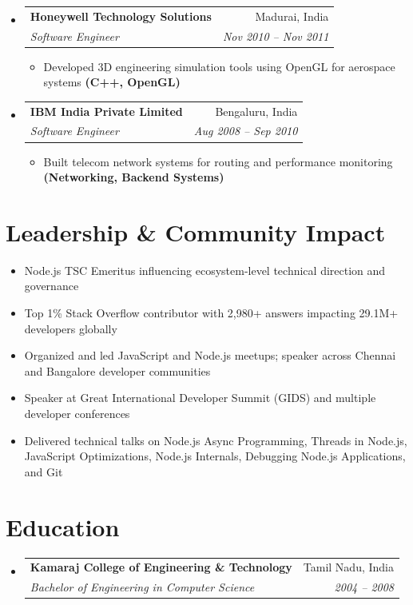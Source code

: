 \documentclass[letterpaper,11pt]{article}
\makeatletter
\newcommand{\resumeItem}[1]{\item \small{#1}}
\newcommand{\resumeSubheading}[4]{
  \vspace{-2pt}\item
  \begin{tabular*}{0.97\textwidth}{l@{\extracolsep{\fill}}r}
    \textbf{#1} & #2 \\
    \textit{\small#3} & \textit{\small #4} \\
  \end{tabular*}\vspace{-6pt}
}
\makeatother
\begin{document}
\begin{itemize}[leftmargin=*]
\resumeSubheading
{Honeywell Technology Solutions}{Madurai, India}
{Software Engineer}{Nov 2010 -- Nov 2011}

\begin{itemize}[leftmargin=*]
  \resumeItem{Developed 3D engineering simulation tools using OpenGL for aerospace systems \textbf{(C++, OpenGL)}}
\end{itemize}

\resumeSubheading
{IBM India Private Limited}{Bengaluru, India}
{Software Engineer}{Aug 2008 -- Sep 2010}

\begin{itemize}[leftmargin=*]
  \resumeItem{Built telecom network systems for routing and performance monitoring \textbf{(Networking, Backend Systems)}}
\end{itemize}

\end{itemize}

\section{Leadership \& Community Impact}
\begin{itemize}[leftmargin=*]

  \resumeItem{Node.js TSC Emeritus influencing ecosystem-level technical direction and governance}

  \resumeItem{Top 1\% Stack Overflow contributor with 2,980+ answers impacting 29.1M+ developers globally}

  \resumeItem{Organized and led JavaScript and Node.js meetups; speaker across Chennai and Bangalore developer communities}

  \resumeItem{Speaker at Great International Developer Summit (GIDS) and multiple developer conferences}

  \resumeItem{Delivered technical talks on Node.js Async Programming, Threads in Node.js, JavaScript Optimizations, Node.js Internals, Debugging Node.js Applications, and Git}

\end{itemize}

\section{Education}
\begin{itemize}[leftmargin=*]
  \resumeSubheading
    {Kamaraj College of Engineering \& Technology}{Tamil Nadu, India}
    {Bachelor of Engineering in Computer Science}{2004 -- 2008}
\end{itemize}
\end{document}
